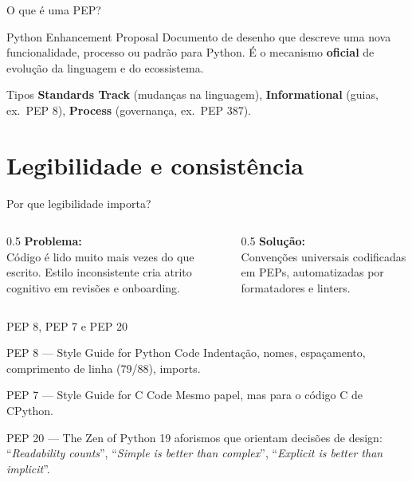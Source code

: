 \documentclass[aspectratio=169]{beamer}
\begin{document}
\begin{frame}{O que é uma PEP?}
  \begin{block}{Python Enhancement Proposal}
    Documento de desenho que descreve uma nova funcionalidade, processo
    ou padrão para Python. É o mecanismo \textbf{oficial} de evolução
    da linguagem e do ecossistema.
  \end{block}
  \begin{exampleblock}{Tipos}
    \textbf{Standards Track} (mudanças na linguagem), \textbf{Informational}
    (guias, ex.\ PEP 8), \textbf{Process} (governança, ex.\ PEP 387).
  \end{exampleblock}
\end{frame}

\section{Legibilidade e consistência}

\begin{frame}{Por que legibilidade importa?}
  \begin{columns}[T]
    \begin{column}{0.5\textwidth}
      \textbf{Problema:}\\
      Código é lido muito mais vezes do que escrito. Estilo inconsistente
      cria atrito cognitivo em revisões e onboarding.
    \end{column}
    \begin{column}{0.5\textwidth}
      \textbf{Solução:}\\
      Convenções universais codificadas em PEPs, automatizadas por
      formatadores e linters.
    \end{column}
  \end{columns}
\end{frame}

\begin{frame}{PEP 8, PEP 7 e PEP 20}
  \begin{block}{PEP 8 --- Style Guide for Python Code}
    Indentação, nomes, espaçamento, comprimento de linha (79/88), imports.
  \end{block}
  \begin{block}{PEP 7 --- Style Guide for C Code}
    Mesmo papel, mas para o código C de CPython.
  \end{block}
  \begin{exampleblock}{PEP 20 --- The Zen of Python}
    19 aforismos que orientam decisões de design:
    ``\emph{Readability counts}'', ``\emph{Simple is better than complex}'',
    ``\emph{Explicit is better than implicit}''.
  \end{exampleblock}
\end{frame}
\end{document}
